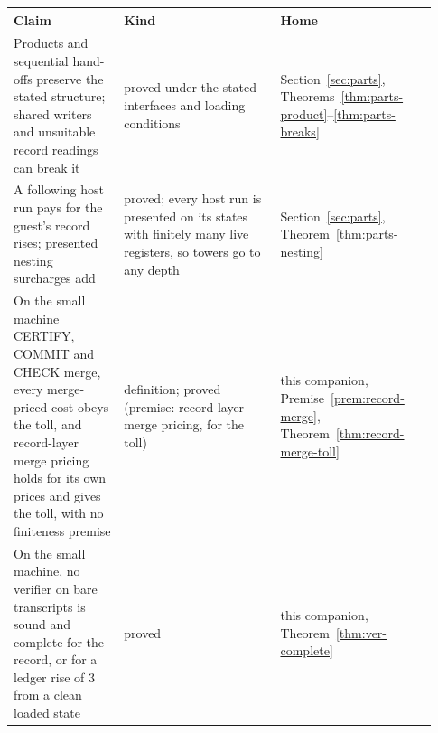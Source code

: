 \documentclass[11pt,twoside]{article}
\theoremstyle{thielethm}
\theoremstyle{thieledef}
\theoremstyle{thieledef}
\theoremstyle{thieledef}
\theoremstyle{thielethm}
\theoremstyle{thieleobs}
\theoremstyle{thielethm}
\begin{document}
\begingroup\small
\begin{longtable}{@{}>{\raggedright\arraybackslash}p{0.242\linewidth}>{\raggedright\arraybackslash}p{0.344\linewidth}>{\raggedright\arraybackslash}p{0.344\linewidth}@{}}
\toprule
\textbf{Claim} & \textbf{Kind} & \textbf{Home} \\
\midrule
\endhead
\bottomrule
\endlastfoot
Products and sequential hand-offs preserve the stated structure; shared writers and unsuitable record readings can break it & proved under the stated interfaces and loading conditions & Section~\ref{sec:parts}, Theorems~\ref{thm:parts-product}--\ref{thm:parts-breaks} \\
A following host run pays for the guest's record rises; presented nesting surcharges add & proved; every host run is presented on its states with finitely many live registers, so towers go to any depth & Section~\ref{sec:parts}, Theorem~\ref{thm:parts-nesting} \\
On the small machine CERTIFY, COMMIT and CHECK merge, every merge-priced cost obeys the toll, and record-layer merge pricing holds for its own prices and gives the toll, with no finiteness premise & definition; proved (premise: record-layer merge pricing, for the toll) & this companion, Premise~\ref{prem:record-merge}, Theorem~\ref{thm:record-merge-toll} \\
On the small machine, no verifier on bare transcripts is sound and complete for the record, or for a ledger rise of 3 from a clean loaded state & proved & this companion, Theorem~\ref{thm:ver-complete} \\
\end{longtable}
\endgroup
\end{document}
